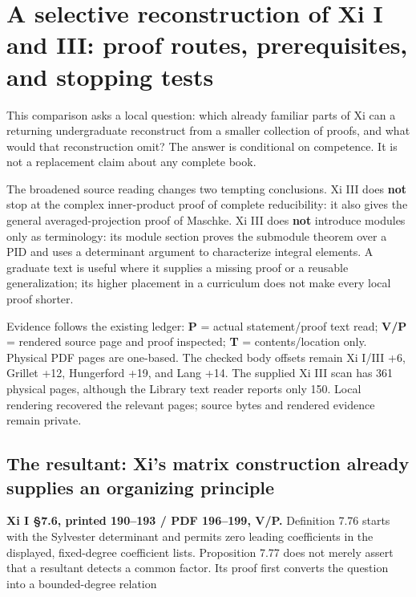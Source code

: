 \documentclass[
  11pt,
]{article}
\begin{document}
\section{A selective reconstruction of Xi I and III: proof routes,
prerequisites, and stopping
tests}\label{a-selective-reconstruction-of-xi-i-and-iii-proof-routes-prerequisites-and-stopping-tests}

This comparison asks a local question: which already familiar parts of
Xi can a returning undergraduate reconstruct from a smaller collection
of proofs, and what would that reconstruction omit? The answer is
conditional on competence. It is not a replacement claim about any
complete book.

The broadened source reading changes two tempting conclusions. Xi III
does \textbf{not} stop at the complex inner-product proof of complete
reducibility: it also gives the general averaged-projection proof of
Maschke. Xi III does \textbf{not} introduce modules only as terminology:
its module section proves the submodule theorem over a PID and uses a
determinant argument to characterize integral elements. A graduate text
is useful where it supplies a missing proof or a reusable
generalization; its higher placement in a curriculum does not make every
local proof shorter.

Evidence follows the existing ledger: \textbf{P} = actual
statement/proof text read; \textbf{V/P} = rendered source page and proof
inspected; \textbf{T} = contents/location only. Physical PDF pages are
one-based. The checked body offsets remain Xi I/III +6, Grillet +12,
Hungerford +19, and Lang +14. The supplied Xi III scan has 361 physical
pages, although the Library text reader reports only 150. Local
rendering recovered the relevant pages; source bytes and rendered
evidence remain private.

\subsection{The resultant: Xi's matrix construction already supplies an
organizing
principle}\label{the-resultant-xis-matrix-construction-already-supplies-an-organizing-principle}

\textbf{Xi I §7.6, printed 190--193 / PDF 196--199, V/P.} Definition
7.76 starts with the Sylvester determinant and permits zero leading
coefficients in the displayed, fixed-degree coefficient lists.
Proposition 7.77 does not merely assert that a resultant detects a
common factor. Its proof first converts the question into a
bounded-degree relation
\end{document}
